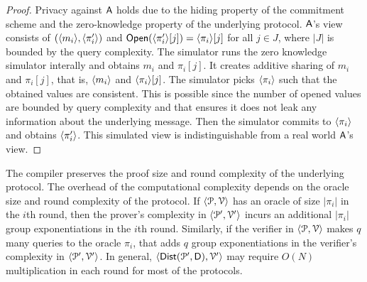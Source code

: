 \begin{proof}
	Privacy against $\mathsf{A}$ holds due to the hiding property of the commitment scheme and the zero-knowledge property of the underlying protocol. $\mathsf{A}$'s view consists of $(\langle m_i \rangle, \langle \pi'_i \rangle)$ and $\mathsf{Open}(\langle \pi'_i \rangle[j]) = \langle \pi_i \rangle[j]$ for all $j \in J$, where $|J|$ is bounded by the query complexity. 
	The simulator runs the zero knowledge simulator interally and obtains $m_i$ and $\pi_i[j]$. It creates additive sharing of $m_i$ and $\pi_i[j]$, that is, $\langle m_i \rangle$ and $\langle \pi_i \rangle[j]$. The simulator picks $\langle \pi_i \rangle$ such that the obtained values are consistent. This is possible since the number of opened values are bounded by query complexity and that ensures it does not leak any information about the underlying message. Then the simulator commits to $\langle \pi_i \rangle$ and obtains $\langle \pi'_i \rangle$. This simulated view is indistinguishable from a real world $\mathsf{A}$'s view.
\end{proof}

The compiler preserves the proof size and round complexity of the underlying protocol. The overhead of the computational complexity depends on the oracle size and round complexity of the protocol. If $\langle \mathcal{P},\mathcal{V}\rangle$ has an oracle of size $|\pi_i|$ in the $i$th round, then the prover's complexity in $\langle \mathcal{P}',\mathcal{V}'\rangle$ incurs an additional $|\pi_i|$ group exponentiations in the $i$th round. Similarly, if the verifier in $\langle \mathcal{P},\mathcal{V}\rangle$ makes $q$ many queries to the oracle $\pi_i$, that adds $q$ group exponentiations in the verifier's complexity in $\langle \mathcal{P}',\mathcal{V}'\rangle$. In general, $\langle \mathsf{Dist}(\mathcal{P}', \mathsf{D}),\mathcal{V}'\rangle$ may require $O(N)$ multiplication in each round for most of the protocols.







